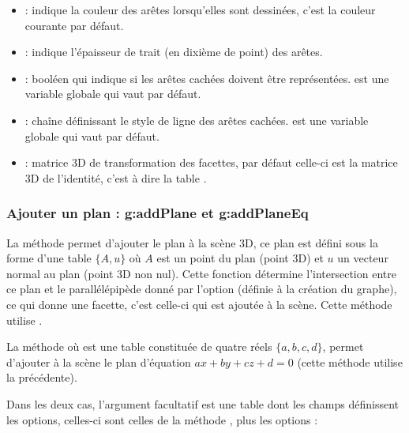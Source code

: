 \begin{itemize}
        \item {} : indique la couleur des arêtes lorsqu'elles sont dessinées, c'est la couleur courante par défaut.
        
        \item {}: indique l'épaisseur de trait (en dixième de point) des arêtes.
        \item {} : booléen qui indique si les arêtes cachées doivent être représentées.  est une variable globale qui vaut \false par défaut.
        
        \item {} : chaîne définissant le style de ligne des arêtes cachées.  est une variable globale qui vaut  par défaut.
        
        \item {} : matrice 3D de transformation des facettes, par défaut celle-ci est la matrice 3D de l'identité, c'est à dire la table .
    \end{itemize}

\subsubsection{Ajouter un plan : g:addPlane et g:addPlaneEq}

La méthode  permet d'ajouter le plan  à la scène 3D, ce plan est défini sous la forme d'une table $\{A,u\}$ où $A$ est un point du plan (point 3D) et $u$ un vecteur normal au plan (point 3D non nul). Cette fonction détermine l'intersection entre ce plan et le parallélépipède donné par l'option  (définie à la création du graphe), ce qui donne une facette, c'est celle-ci qui est ajoutée à la scène. Cette méthode utilise .

La méthode  où  est une table constituée de quatre réels $\{a,b,c,d\}$, permet d'ajouter à la scène le plan d'équation $ax+by+cz+d=0$ (cette méthode utilise la précédente).

Dans les deux cas, l'argument facultatif  est une table dont les champs définissent les options, celles-ci sont celles de la méthode , plus les options :

